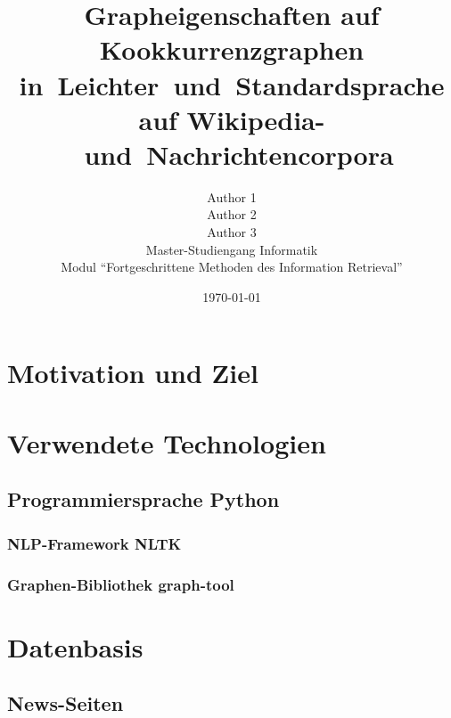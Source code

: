 \documentclass[12pt]{article}
\title{Grapheigenschaften auf Kookkurrenzgraphen in~Leichter~und~Standardsprache auf Wikipedia-~und~Nachrichtencorpora}
\author{Author 1\\Author 2\\Author 3\\Master-Studiengang  Informatik\\Modul "`Fortgeschrittene Methoden des Information Retrieval"'}
\date{\today}
\begin{document}
\maketitle


\section{Motivation und Ziel}



\section{Verwendete Technologien}
\subsection{Programmiersprache Python}

\subsubsection{NLP-Framework NLTK}

\subsubsection{Graphen-Bibliothek graph-tool}








\section{Datenbasis}

\subsection{News-Seiten}
\end{document}
